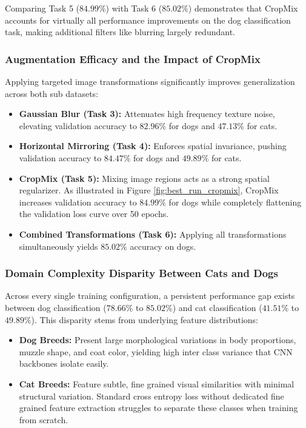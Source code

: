 Comparing Task 5 ($84.99\%$) with Task 6 ($85.02\%$) demonstrates that CropMix accounts for virtually all performance improvements on the dog classification task, making additional filters like blurring largely redundant.
\subsubsection{Augmentation Efficacy and the Impact of CropMix}
Applying targeted image transformations significantly improves generalization across both sub datasets:
\begin{itemize}
    \item \textbf{Gaussian Blur (Task 3):} Attenuates high frequency texture noise, elevating validation accuracy to $82.96\%$ for dogs and $47.13\%$ for cats.
    \item \textbf{Horizontal Mirroring (Task 4):} Enforces spatial invariance, pushing validation accuracy to $84.47\%$ for dogs and $49.89\%$ for cats.
    \item \textbf{CropMix (Task 5):} Mixing image regions acts as a strong spatial regularizer. As illustrated in Figure \ref{fig:best_run_cropmix}, CropMix increases validation accuracy to $84.99\%$ for dogs while completely flattening the validation loss curve over 50 epochs.
    \item \textbf{Combined Transformations (Task 6):} Applying all transformations simultaneously yields $85.02\%$ accuracy on dogs.
\end{itemize}

\subsubsection{Domain Complexity Disparity Between Cats and Dogs}
Across every single training configuration, a persistent performance gap exists between dog classification ($78.66\%$ to $85.02\%$) and cat classification ($41.51\%$ to $49.89\%$). This disparity stems from underlying feature distributions:
\begin{itemize}
    \item \textbf{Dog Breeds:} Present large morphological variations in body proportions, muzzle shape, and coat color, yielding high inter class variance that CNN backbones isolate easily.
    \item \textbf{Cat Breeds:} Feature subtle, fine grained visual similarities with minimal structural variation. Standard cross entropy loss without dedicated fine grained feature extraction struggles to separate these classes when training from scratch.
\end{itemize}


